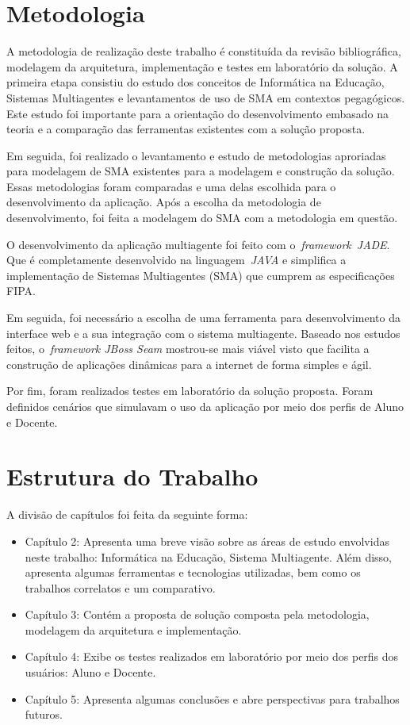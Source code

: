\section{Metodologia}

A metodologia de realização deste trabalho é constituída da revisão bibliográfica, modelagem da arquitetura, implementação e testes em laboratório da solução. A primeira etapa consistiu do estudo dos conceitos de Informática na Educação, Sistemas Multiagentes e levantamentos de uso de SMA em contextos pegagógicos. Este estudo foi importante para a orientação do desenvolvimento embasado na teoria e a comparação das ferramentas existentes com a solução proposta.

Em seguida, foi realizado o levantamento e estudo de metodologias aproriadas para modelagem de SMA existentes para a modelagem e construção da solução. Essas metodologias foram comparadas e uma delas escolhida para o desenvolvimento da aplicação. Após a escolha da metodologia de desenvolvimento, foi feita a modelagem do SMA com a metodologia em questão.

O desenvolvimento da aplicação multiagente foi feito com o~\emph{framework}~\emph{JADE}. Que é completamente desenvolvido na linguagem~\emph{JAVA} e simplifica a implementação de Sistemas Multiagentes (SMA) que cumprem as especificações FIPA. 

Em seguida, foi necessário a escolha de uma ferramenta para desenvolvimento da interface web e a sua integração com o sistema multiagente. Baseado nos estudos feitos, o~\emph{framework JBoss Seam} mostrou-se mais viável visto que facilita a construção de aplicações dinâmicas para a internet de forma simples e ágil.

Por fim, foram realizados testes em laboratório da solução proposta. Foram definidos cenários que simulavam o uso da aplicação por meio dos perfis de Aluno e Docente.

\section{Estrutura do Trabalho}
A divisão de capítulos foi feita da seguinte forma:
\begin{itemize}
	\item Capítulo 2: Apresenta uma breve visão sobre as áreas de estudo envolvidas neste trabalho: Informática na Educação, Sistema Multiagente. Além disso, apresenta algumas ferramentas e tecnologias utilizadas, bem como os trabalhos correlatos e um comparativo.
	\item Capítulo 3: Contém a proposta de solução composta pela metodologia, modelagem da arquitetura e implementação.
	\item Capítulo 4: Exibe os testes realizados em laboratório por meio dos perfis dos usuários: Aluno e Docente.
	\item Capítulo 5: Apresenta algumas conclusões e abre perspectivas para trabalhos futuros.
\end{itemize}

